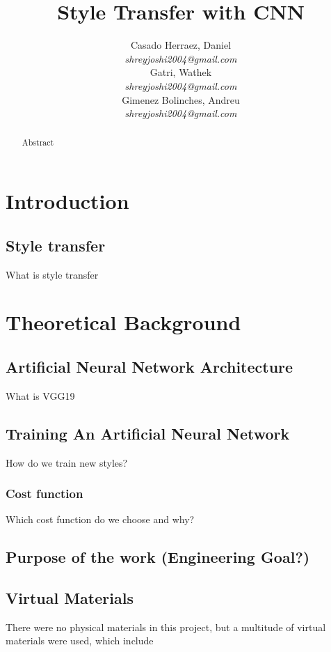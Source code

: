 \documentclass{article}
\title{\textbf{Style Transfer with CNN}}
\author{
  Casado Herraez, Daniel \\
  \textit{shreyjoshi2004@gmail.com} \\
  \And
  Gatri, Wathek \\
  \textit{shreyjoshi2004@gmail.com} \\
  \And
  Gimenez Bolinches, Andreu \\
  \textit{shreyjoshi2004@gmail.com} \\
}
\begin{document}
\maketitle
\begin{abstract} \normalsize

Abstract

\end{abstract}



\vfill

\section{Introduction}
\subsection{Style transfer}
What is style transfer

\section{Theoretical Background}

\subsection{Artificial Neural Network Architecture}
What is VGG19

\subsection{Training An Artificial Neural Network}
How do we train new styles?

\subsubsection{Cost function}
Which cost function do we choose and why?

\subsection{Purpose of the work (Engineering Goal?)}

\subsection{Virtual Materials}
There were no physical materials in this project, but a multitude of virtual materials were used, which include
\end{document}
